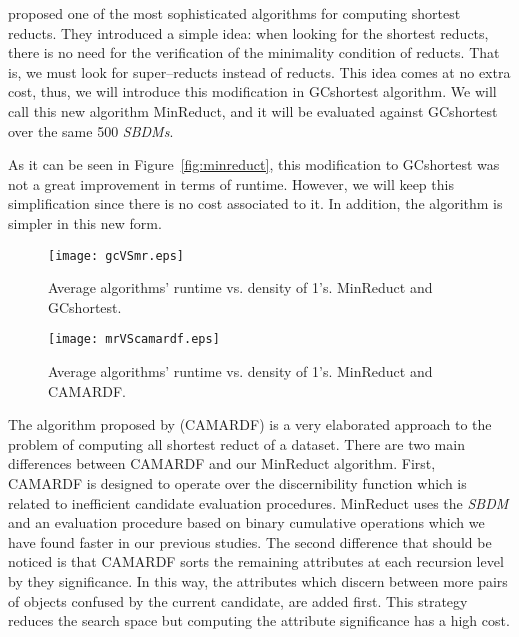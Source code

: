 \documentclass[authoryear,11pt]{elsarticle}
\begin{document}
 \cite{Zhou2009} proposed one of the most sophisticated algorithms for computing shortest reducts. They introduced a simple idea: when looking for the shortest reducts, there is no need for the verification of the minimality condition of reducts. That is, we must look for super--reducts instead of reducts. This idea comes at no extra cost, thus, we will introduce this modification in GCshortest algorithm. We will call this new algorithm MinReduct, and it will be evaluated against GCshortest over the same 500 \textit{SBDMs}.
 
 As it can be seen in Figure~\ref{fig:minreduct}, this modification to GCshortest was not a great improvement in terms of runtime. However, we will keep this simplification since there is no cost associated to it. In addition, the algorithm is simpler in this new form. 
 
   \begin{figure}[htb]
   	\begin{minipage}{.48\linewidth}  	
   		\begin{center}
   			\texttt{[image: gcVSmr.eps]}
   		\end{center}
   		\caption{Average algorithms' runtime vs. density of 1's. MinReduct and GCshortest.}
   		\label{fig:minreduct}
   	\end{minipage}
   	\begin{minipage}{.48\linewidth}  
   		\begin{center}
   			\texttt{[image: mrVScamardf.eps]}
   		\end{center}
   		\caption{Average algorithms' runtime vs. density of 1's. MinReduct and CAMARDF.}
   		\label{fig:camardf}
   	\end{minipage}
   \end{figure}
   
   The algorithm proposed by \cite{Zhou2009} (CAMARDF) is a very elaborated approach to the problem of computing all shortest reduct of a dataset. There are two main differences between CAMARDF  and our MinReduct algorithm. First, CAMARDF is designed to operate over the discernibility function which is related to inefficient candidate evaluation procedures. MinReduct uses the \textit{SBDM} and an evaluation procedure based on binary cumulative operations which we have found faster in our previous studies. The second difference that should be noticed is that CAMARDF sorts the remaining attributes at each recursion level by they significance. In this way, the attributes which discern between more pairs of objects confused by the current candidate, are added first. This strategy reduces the search space but computing the attribute significance has a high cost.
   
\end{document}
